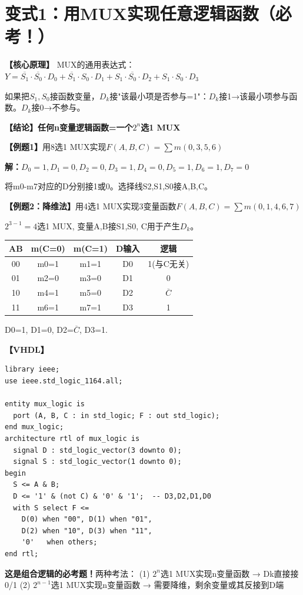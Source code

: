 \section{变式1：用MUX实现任意逻辑函数（必考！）}

\begin{detailbox}[完整教学]
\textbf{【核心原理】}
MUX的通用表达式：$Y=\overline{S_1}\cdot\overline{S_0}\cdot D_0+\overline{S_1}\cdot S_0\cdot D_1+S_1\cdot\overline{S_0}\cdot D_2+S_1\cdot S_0\cdot D_3$

如果把$S_1,S_0$接函数变量，$D_k$接"该最小项是否参与=1"：$D_k$接1→该最小项参与函数。$D_k$接0→不参与。

\textbf{【结论】任何n变量逻辑函数=一个$2^n$选1 MUX}

\textbf{【例题1】}用8选1 MUX实现$F(A,B,C)=\sum m(0,3,5,6)$

\textbf{解：}$D_0=1,D_1=0,D_2=0,D_3=1,D_4=0,D_5=1,D_6=1,D_7=0$

将m0-m7对应的D分别接1或0。选择线S2,S1,S0接A,B,C。

\textbf{【例题2：降维法】}用4选1 MUX实现3变量函数$F(A,B,C)=\sum m(0,1,4,6,7)$

$2^{3-1}=4$选1 MUX, 变量A,B接S1,S0, C用于产生$D_k$。

\begin{center}
\begin{tabular}{|c|c|c|c|c|}
\hline
AB & m(C=0) & m(C=1) & D输入 & 逻辑 \\
\hline
00 & m0=1 & m1=1 & D0 & 1(与C无关) \\
01 & m2=0 & m3=0 & D1 & 0 \\
10 & m4=1 & m5=0 & D2 & $\overline{C}$ \\
11 & m6=1 & m7=1 & D3 & 1 \\
\hline
\end{tabular}
\end{center}

D0=1, D1=0, D2=$\overline{C}$, D3=1.

\textbf{【VHDL】}
\begin{lstlisting}
library ieee;
use ieee.std_logic_1164.all;

entity mux_logic is
  port (A, B, C : in std_logic; F : out std_logic);
end mux_logic;
architecture rtl of mux_logic is
  signal D : std_logic_vector(3 downto 0);
  signal S : std_logic_vector(1 downto 0);
begin
  S <= A & B;
  D <= '1' & (not C) & '0' & '1';  -- D3,D2,D1,D0
  with S select F <=
    D(0) when "00", D(1) when "01",
    D(2) when "10", D(3) when "11",
    '0'   when others;
end rtl;
\end{lstlisting}

\begin{examfocus}
\textbf{这是组合逻辑的必考题！}两种考法：
(1) $2^n$选1 MUX实现n变量函数 → Dk直接接0/1
(2) $2^{n-1}$选1 MUX实现n变量函数 → 需要降维，剩余变量或其反接到D端
\end{examfocus}
\end{detailbox}


